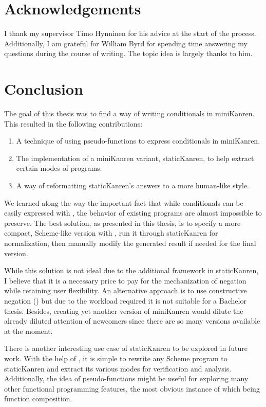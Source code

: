 \section{Acknowledgements}
I thank my supervisor Timo Hynninen for his advice at the start of the process. Additionally, I am grateful for William Byrd for spending time answering my questions during the course of writing. The topic idea is largely thanks to him.

\section{Conclusion}
\ifthesis
The goal of this thesis was to find a way of writing conditionals in miniKanren. This resulted in the following contributions:
\begin{enumerate}
\item A technique of using pseudo-functions to express conditionals in miniKanren.
\item The implementation of a miniKanren variant, staticKanren, to help extract certain modes of programs.
\item A way of reformatting staticKanren's answers to a more human-like style.
\end{enumerate}

We learned along the way the important fact that while conditionals can be easily expressed with , the behavior of existing programs are almost impossible to preserve. The best solution, as presented in this thesis, is to specify a more compact, Scheme-like version with , run it through staticKanren for normalization, then manually modify the generated result if needed for the final version.

While this solution is not ideal due to the additional framework in staticKanren, I believe that it is a necessary price to pay for the mechanization of negation while retaining user flexibility. An alternative approach is to use constructive negation (\cite{chan}) but due to the workload required it is not suitable for a Bachelor thesis. Besides, creating yet another version of miniKanren would dilute the already diluted attention of newcomers since there are so many versions available at the moment.

There is another interesting use case of staticKanren to be explored in future work. With the help of , it is simple to rewrite any Scheme program to staticKanren and extract its various modes for verification and analysis. Additionally, the idea of pseudo-functions might be useful for exploring many other functional programming features, the most obvious instance of which being function composition.







